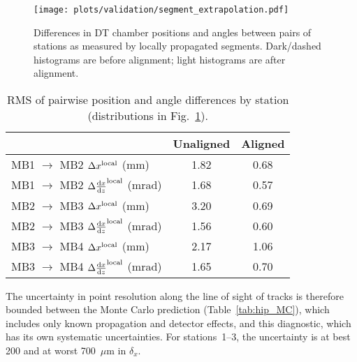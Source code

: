 \documentclass[11pt,twoside,a4paper,cmspaper]{cms-tdr}
\begin{document}
\begin{figure}[p]
  \centering
  \texttt{[image: plots/validation/segment\_extrapolation.pdf]}

  \caption{Differences in DT chamber positions and angles between pairs
  of stations as measured by locally propagated
  segments.  Dark/dashed histograms are before alignment; light histograms
  are after alignment.  \label{fig:valid_NOMvsMPvsHIP}}
\end{figure}

\begin{table}[p]
\caption{RMS of pairwise position and angle differences by station (distributions in Fig.~\ref{fig:valid_NOMvsMPvsHIP}). \label{tab:valid_NOMvsMPvsHIP}}
\centering

\vspace{0.25 cm}
\renewcommand{\arraystretch}{1.5}
\begin{tabular}{l | c c}
\hline\hline & \hspace{0.5 cm} Unaligned \hspace{0.5 cm} & \hspace{0.5 cm} Aligned \hspace{0.5 cm} \\\hline
MB1 $\to$ MB2 \hspace{0.25 cm} $\Delta x^{\mbox{\scriptsize local}}$ (mm) & 1.82 & 0.68 \\
MB1 $\to$ MB2 \hspace{0.25 cm} $\Delta \frac{\textrm{d}x}{\textrm{d}z}^{\mbox{\scriptsize local}}$ (mrad) & 1.68 & 0.57 \\\hline
MB2 $\to$ MB3 \hspace{0.25 cm} $\Delta x^{\mbox{\scriptsize local}}$ (mm) & 3.20 & 0.69 \\
MB2 $\to$ MB3 \hspace{0.25 cm} $\Delta \frac{\textrm{d}x}{\textrm{d}z}^{\mbox{\scriptsize local}}$ (mrad) & 1.56 & 0.60 \\\hline
MB3 $\to$ MB4 \hspace{0.25 cm} $\Delta x^{\mbox{\scriptsize local}}$ (mm) & 2.17 & 1.06 \\
MB3 $\to$ MB4 \hspace{0.25 cm} $\Delta \frac{\textrm{d}x}{\textrm{d}z}^{\mbox{\scriptsize local}}$ (mrad) & 1.65 & 0.70 \\\hline\hline
\end{tabular}
\end{table}

The uncertainty in point resolution along the line of sight of tracks
is therefore bounded between the Monte Carlo prediction
(Table~\ref{tab:hip_MC}), which includes only known propagation and
detector effects, and this diagnostic, which has its own systematic
uncertainties.  For stations~1--3, the uncertainty is at best 200 and
at worst 700~$\mu$m in $\delta_x$.
\end{document}
